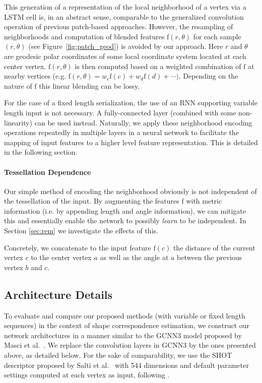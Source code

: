 \documentclass[runningheads]{llncs}
\begin{document}
This generation of a representation of the local neighborhood of a vertex via a LSTM cell is, in an abstract sense, comparable to the generalized convolution operation of previous patch-based approaches. However, the resampling of neighborhoods and computation of blended features $\mathrm{f}(r,\theta)$ for each sample $(r,\theta)$ (see Figure~\ref{fig:patch_geod}) is avoided by our approach.
Here $r$ and $\theta$ are geodesic polar coordinates of some local coordinate system located at each center vertex.
$\mathrm{f}(r,\theta)$ is then computed based on a weighted combination of $\mathrm{f}$ at nearby vertices (e.g. $\mathrm{f}(r,\theta)=w_c \mathrm{f}(c) + w_d \mathrm{f}(d) + \cdots)$. Depending on the nature of $\mathrm{f}$ this linear blending can be lossy.

For the case of a fixed length serialization, the use of an RNN supporting variable length input is not necessary. A fully-connected layer (combined with some non-linearity) can be used instead.
Naturally, we apply these neighborhood encoding operations repeatedly in multiple layers in a neural network to facilitate the mapping of input features to a higher level feature representation. This is detailed in the following section.


\paragraph{\textbf{Tessellation Dependence}}

Our simple method of encoding the neighborhood obviously is not independent of the tessellation of the input.
By augmenting the features $\mathrm{f}$ with metric information (i.e. by appending length and angle information), we can mitigate this and essentially enable the network to possibly \emph{learn} to be independent. In Section \ref{sec:rem} we investigate the effects of this.

Concretely, we concatenate to the input feature $\mathrm{f}(c)$ the distance of the current vertex $c$ to the center vertex $a$
as well as the angle at $a$ between the previous vertex $b$ and $c$.


\subsection{Architecture Details}
To evaluate and compare our proposed methods (with variable or fixed length sequences) in the context of shape correspondence estimation, we construct our network architectures in a manner similar to the GCNN3 model proposed by Masci et al.~\cite{masci2015geodesic}. We replace the convolution layers in GCNN3 by the ones presented above, as detailed below.
For the sake of comparability, we use the SHOT descriptor proposed by Salti et al.~\cite{salti2014shot} with 544 dimensions and default parameter settings computed at each vertex as input, following \cite{boscaini2016learning,monti2017geometric}.
\end{document}
